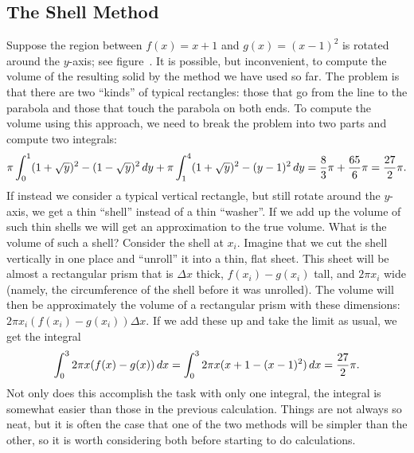 \subsection{The Shell Method}


Suppose the region between $f(x)=x+1$ and $g(x)=(x-1)^2$ is rotated around
the $y$-axis; see figure~. It is possible, but
inconvenient, to compute the  volume of the resulting solid by the
method we have used so far. The problem is that there are two
``kinds'' of typical rectangles: those that go from the line to the
parabola and those that touch the parabola on both ends. To compute
the volume using this approach, we need to break the problem into two
parts and compute two integrals:
$$
  \pi\int_0^1 (1+\sqrt{y})^2-(1-\sqrt{y})^2\, d y+
  \pi\int_1^4  (1+\sqrt{y})^2-(y-1)^2\, d y={8\over3}\pi + {65\over6}\pi
  ={27\over2}\pi.
$$
If instead we consider a typical vertical rectangle, {but still rotate
  around the $y$-axis,} we get a thin ``shell'' instead of a thin
``washer''. If we add up the volume of such thin shells we will get an
approximation to the true volume. What is the volume of such a shell?
Consider the shell at $x_i$.
Imagine that we cut the shell vertically in one place and ``unroll''
it into a thin, flat sheet. This sheet will be almost a rectangular
prism that is $\Delta x$ thick, $f(x_i)-g(x_i)$ tall, and $2\pi x_i$
wide (namely, the circumference of the shell before it was unrolled).
The volume will then be approximately the volume of a rectangular
prism with these dimensions: $2\pi x_i(f(x_i)-g(x_i))\Delta x$. If we
add these up and take the limit as usual, we get the integral
$$
  \int_0^3 2\pi x(f(x)-g(x))\, d x=
  \int_0^3 2\pi x(x+1-(x-1)^2)\, d x={27\over2}\pi.
$$
Not only does this accomplish the task with only one integral, the
integral is somewhat easier than those in the previous
calculation. Things are not always so neat, but it is often the case
that one of the two methods will be simpler than the other, so it is
worth considering both before starting to do calculations.

